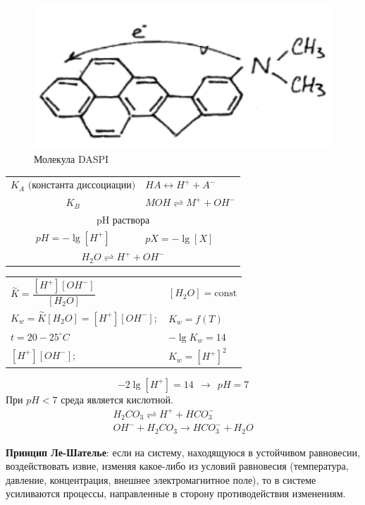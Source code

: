 \begin{lecture}
\begin{lecSection}
	\begin{figure}[h]
		\centering
		\includegraphics[width=0.7\linewidth]{lecture_04/new_daspi}
		\caption[Молекула DASPI]{Молекула DASPI}
		\label{fig:daspi}
	\end{figure}
	
	\begin{center}\begin{tabular}{cl}
		$ K_A \text{ (константа диссоциации)}$ & $HA \leftrightarrow H^+  + A^- $ \\
		$K_B$ & $MOH \rightleftharpoons M^+ + OH^- $ \\
		\multicolumn{2}{c}{$\text{pH раствора} $} \\
		$pH = - \lg [H^+]$ & $pX = - \lg [X] $ \\
		\multicolumn{2}{c}{$H_2O \rightleftharpoons H^+ + OH^- $} \\
	\end{tabular}\end{center}
	\begin{center}\begin{tabular}{ll}
	$ \overset{\sim}{K} = \dfrac{[H^+][OH^-]}{[H_2O]} $ & $ [H_2O] = \text{const} $ \\
	$ K_w = \overset{\sim}{K} [H_2O] = [H^+][OH^-]; $ & $ K_w = f(T) $ \\
	$ t = 20 - 25 ^\circ C $ & $ -\lg K_w = 14 $ \\
	$ [H^+][OH^-]; $ & $ K_w = [H^+]^2 $
	\end{tabular}\end{center}
	\[ -2 \lg [H^+]  = 14 ~~ \rightarrow ~~ pH = 7 \]
	При $ pH < 7 $ среда является кислотной.
	\begin{gather*}
	H_2 CO_3 \rightleftharpoons H^+ + HCO_3^- \\
	OH^- + H_2 CO_3 \rightarrow HCO_3^- + H_2O
	\end{gather*}
	
	\textbf{Принцип Ле-Шателье}: если на систему, находящуюся в устойчивом равновесии, воздействовать извне, изменяя какое-либо из условий равновесия (температура, давление, концентрация, внешнее электромагнитное поле), то в системе усиливаются процессы, направленные в сторону противодействия изменениям.
	

\end{lecSection}
\end{lecture}
